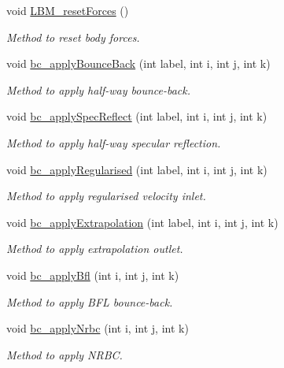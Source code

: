 \begin{DoxyCompactItemize}
void \hyperlink{class_grid_obj_a5701631be6333e512c7fc8dd6ecabf85}{L\+B\+M\+\_\+reset\+Forces} ()
\begin{DoxyCompactList}\small\item\em Method to reset body forces. \end{DoxyCompactList}\item 
void \hyperlink{class_grid_obj_a2dc94b1d2e3f14a1a086b8bfa078839b}{bc\+\_\+apply\+Bounce\+Back} (int label, int i, int j, int k)
\begin{DoxyCompactList}\small\item\em Method to apply half-\/way bounce-\/back. \end{DoxyCompactList}\item 
void \hyperlink{class_grid_obj_ae1d63a43d1dee6c7b25880c8a9bb97c9}{bc\+\_\+apply\+Spec\+Reflect} (int label, int i, int j, int k)
\begin{DoxyCompactList}\small\item\em Method to apply half-\/way specular reflection. \end{DoxyCompactList}\item 
void \hyperlink{class_grid_obj_a5602705b2575b09e27dd0065de3542f6}{bc\+\_\+apply\+Regularised} (int label, int i, int j, int k)
\begin{DoxyCompactList}\small\item\em Method to apply regularised velocity inlet. \end{DoxyCompactList}\item 
void \hyperlink{class_grid_obj_a385c4803f4803e380a520ac9b3dcb31d}{bc\+\_\+apply\+Extrapolation} (int label, int i, int j, int k)
\begin{DoxyCompactList}\small\item\em Method to apply extrapolation outlet. \end{DoxyCompactList}\item 
void \hyperlink{class_grid_obj_aeff3b54617b7ae65f08c96e653f9035f}{bc\+\_\+apply\+Bfl} (int i, int j, int k)
\begin{DoxyCompactList}\small\item\em Method to apply B\+FL bounce-\/back. \end{DoxyCompactList}\item 
void \hyperlink{class_grid_obj_ae4fd999e7334c8ec8e1118c92e0c7338}{bc\+\_\+apply\+Nrbc} (int i, int j, int k)
\begin{DoxyCompactList}\small\item\em Method to apply N\+R\+BC. \end{DoxyCompactList}\item 

\end{DoxyCompactItemize}
